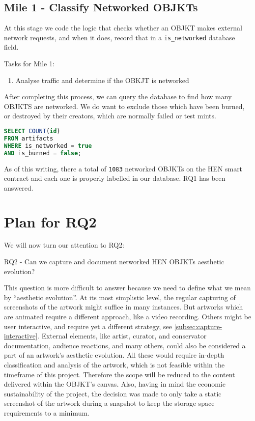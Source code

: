 \subsection {Mile 1 - Classify Networked OBJKTs}

At this stage we code the logic that checks whether an OBJKT makes external network requests, and when it does, record that in a \texttt{is\_networked} database field.

Tasks for Mile 1:
\begin{enumerate}
	\item Analyse traffic and determine if the OBKJT is networked
\end{enumerate}


After completing this process, we can query the database to find how many OBJKTS are networked. We do want to exclude those which have been burned, or destroyed by their creators, which are normally failed or test mints.

\begin{center}
\begin{lstlisting}[language=SQL, caption={SQL query - number of networked OBJKTs}]
SELECT COUNT(id)
FROM artifacts
WHERE is_networked = true
AND is_burned = false;
\end{lstlisting}
\end{center}

As of this writing, there a total of \texttt{1083} networked OBJKTs on the HEN smart contract and each one is properly labelled in our database. RQ1 has been answered.


\section{Plan for RQ2}

We will now turn our attention to RQ2:

\vspace{0.5cm}
RQ2 - Can we capture and document networked HEN OBJKTs aesthetic evolution?
\vspace{0.5cm}


This question is more difficult to answer because we need to define what we mean by ``aesthetic evolution''. At its most simplistic level, the regular capturing of screenshots of the artwork might suffice in many instances. But artworks which are animated require a different approach, like a video recording. Others might be user interactive, and require yet a different strategy, see \autoref{subsec:capture-interactive}. External elements, like artist, curator, and conservator documentation, audience reactions, and many others, could also be considered a part of an artwork's aesthetic evolution. All these would require in-depth classification and analysis of the artwork, which is not feasible within the timeframe of this project. Therefore the scope will be reduced to the content delivered within the OBJKT's canvas. Also, having in mind the economic sustainability of the project, the decision was made to only take a static screenshot of the artwork during a snapshot to keep the storage space requirements to a minimum.


